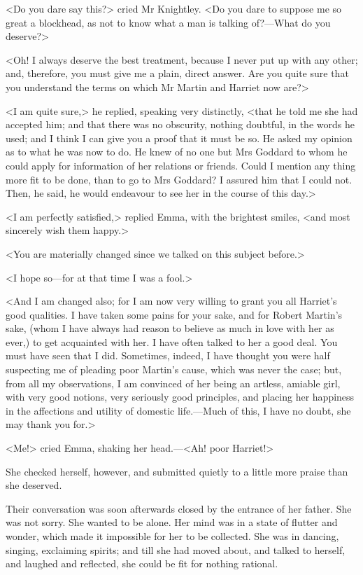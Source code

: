 <Do you dare say this?> cried Mr Knightley. <Do you dare to suppose me so great a blockhead, as not to know what a man is talking of?—What do you deserve?>

<Oh! I always deserve the best treatment, because I never put up with any other; and, therefore, you must give me a plain, direct answer. Are you quite sure that you understand the terms on which Mr Martin and Harriet now are?>

<I am quite sure,> he replied, speaking very distinctly, <that he told me she had accepted him; and that there was no obscurity, nothing doubtful, in the words he used; and I think I can give you a proof that it must be so. He asked my opinion as to what he was now to do. He knew of no one but Mrs Goddard to whom he could apply for information of her relations or friends. Could I mention any thing more fit to be done, than to go to Mrs Goddard? I assured him that I could not. Then, he said, he would endeavour to see her in the course of this day.>

<I am perfectly satisfied,> replied Emma, with the brightest smiles, <and most sincerely wish them happy.>

<You are materially changed since we talked on this subject before.>

<I hope so—for at that time I was a fool.>

<And I am changed also; for I am now very willing to grant you all Harriet's good qualities. I have taken some pains for your sake, and for Robert Martin's sake, (whom I have always had reason to believe as much in love with her as ever,) to get acquainted with her. I have often talked to her a good deal. You must have seen that I did. Sometimes, indeed, I have thought you were half suspecting me of pleading poor Martin's cause, which was never the case; but, from all my observations, I am convinced of her being an artless, amiable girl, with very good notions, very seriously good principles, and placing her happiness in the affections and utility of domestic life.—Much of this, I have no doubt, she may thank you for.>

<Me!> cried Emma, shaking her head.—<Ah! poor Harriet!>

She checked herself, however, and submitted quietly to a little more praise than she deserved.

Their conversation was soon afterwards closed by the entrance of her father. She was not sorry. She wanted to be alone. Her mind was in a state of flutter and wonder, which made it impossible for her to be collected. She was in dancing, singing, exclaiming spirits; and till she had moved about, and talked to herself, and laughed and reflected, she could be fit for nothing rational.

